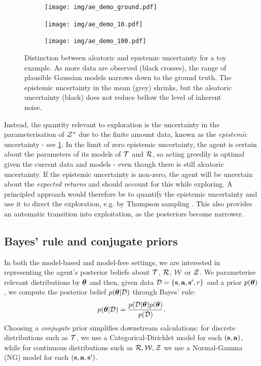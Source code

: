 \documentclass{article}
\begin{document}
\begin{figure}[h!]
\centering
\begin{subfigure}{0.22\textwidth}
\texttt{[image: img/ae\_demo\_ground.pdf]}
\end{subfigure}
\begin{subfigure}{0.22\textwidth}
\texttt{[image: img/ae\_demo\_10.pdf]}
\end{subfigure}
\begin{subfigure}{0.22\textwidth}
\texttt{[image: img/ae\_demo\_100.pdf]}
\end{subfigure}
\captionsetup{width=0.9\linewidth}
\caption{Distinction between aleatoric and epistemic uncertainty for a toy example. As more data are observed (black crosses), the range of plausible Gaussian models narrows down to the ground truth. The epistemic uncertainty in the mean (grey) shrinks, but the aleatoric uncertainty (black) does not reduce bellow the level of inherent noise.}\label{ae_demo}
\end{figure}

Instead, the quantity relevant to exploration is the uncertainty in the parameterisation of $\mathcal{Z}^*$ due to the finite amount data, known as the \textit{epistemic} uncertainty - see \cref{ae_demo}. In the limit of zero epistemic uncertainty, the agent is certain about the parameters of its models of $\mathcal{T}$ and $\mathcal{R}$, so acting greedily is optimal given the current data and models - even though there is still aleatoric uncertainty. If the epistemic uncertainty is non-zero, the agent will be uncertain about the \textit{expected returns} and should account for this while exploring. A principled approach would therefore be to quantify the epistemic uncertainty and use it to direct the exploration, e.g. by Thompson sampling \citep{thompson}. This also provides an automatic transition into exploitation, as the posteriors become narrower.

\subsection{Bayes' rule and conjugate priors}

In both the model-based and model-free settings, we are interested in representing the agent's posterior beliefs about $\mathcal{T}$, $\mathcal{R}$, $\mathcal{W}$ or $\mathcal{Z}$. We parameterise relevant distributions by $\boldsymbol{\theta}$ and then, given data $\mathcal{D} = \{\mathbf{s}, \mathbf{a}, \mathbf{s}', r\}$ and a prior $p(\boldsymbol{\theta})$, we compute the posterior belief $p(\boldsymbol{\theta} | \mathcal{D})$ through Bayes' rule:
\begin{align}
p(\boldsymbol{\theta} | \mathcal{D}) = \frac{p(\mathcal{D} | \boldsymbol{\theta}) p(\boldsymbol{\theta})}{p(\mathcal{D})}.
\end{align}
Choosing a \textit{conjugate} prior simplifies downstream calculations: for discrete distributions such as $\mathcal{T}$, we use a Categorical-Dirichlet model \citep{bishop} for each $(\mathbf{s}, \mathbf{a})$, while for continuous distributions such as $\mathcal{R}, \mathcal{W}, \mathcal{Z}$ we use a Normal-Gamma (NG) model \citep{murphy} for each $(\mathbf{s}, \mathbf{a}, \mathbf{s}')$.
\end{document}
